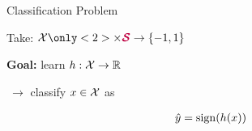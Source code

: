\documentclass[17pt,aspectratio=169]{beamer}
\begin{document}
\begin{frame}[t]{Classification Problem\\[-0.5em]
    \normalsize {}}

  \vspace{-1em}

  \begin{minipage}{0.45\linewidth}

    Take: $\cX \only<2>{\times \textcolor{purple}{\boldsymbol{\cS}}} \rightarrow \{-1, 1\}$

    \vspace{1em}

    \textbf{Goal:} learn $h : \mathcal X \rightarrow \mathbb R$

    \vspace{0.5em}

    $~\rightarrow$ classify $x \in \mathcal X$ as

    \vspace{-2em}

    \begin{align*}
      \hat y = \operatorname{sign}(h(x))
    \end{align*}

  \end{minipage}~~%
  \begin{minipage}{0.5\linewidth}


\end{minipage}
\end{frame}
\end{document}
